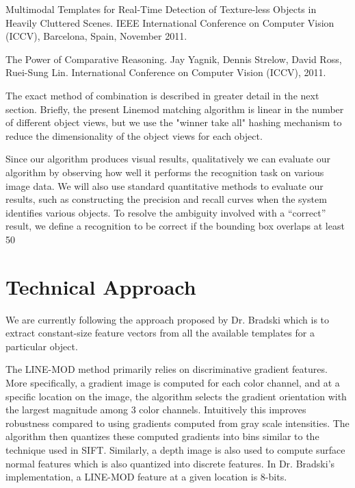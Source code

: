 \documentclass[10pt,twocolumn,letterpaper]{article}
\begin{document}
Multimodal Templates for Real-Time Detection of Texture-less Objects in Heavily Cluttered Scenes. IEEE International Conference on Computer Vision (ICCV), Barcelona, Spain, November 2011.

The Power of Comparative Reasoning. Jay Yagnik, Dennis Strelow, David Ross, Ruei-Sung Lin. International Conference on Computer Vision (ICCV), 2011.

The exact method of combination is described in greater detail in the next section. Briefly, the present Linemod matching algorithm is linear in the number of different object views, but we use the "winner take all" hashing mechanism to reduce the dimensionality of the object views for each object.

Since our algorithm produces visual results, qualitatively we can evaluate our algorithm by observing how well it performs the recognition task on various image data. We will also use standard quantitative methods to evaluate our results, such as constructing the precision and recall curves when the system identifies various objects. To resolve the ambiguity involved with a “correct” result, we deﬁne a recognition to be correct if the bounding box overlaps at least 50%

\section{Technical Approach}

We are currently following the approach proposed by Dr. Bradski which is to extract constant-size feature vectors from all the available templates for a particular object.

The LINE-MOD method primarily relies on discriminative gradient features. More specifically, a gradient image is computed for each color channel, and at a specific location on the image, the algorithm selects the gradient orientation with the largest magnitude among 3 color channels. Intuitively this improves robustness compared to using gradients computed from gray scale intensities. The algorithm then quantizes these computed gradients into bins similar to the technique used in SIFT. Similarly, a depth image is also used to compute surface normal features which is also quantized into discrete features. In Dr. Bradski’s implementation, a LINE-MOD feature at a given location is 8-bits.
\end{document}
